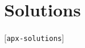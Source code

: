 \documentclass{amsart}
\newcommand{\lbl}[1]{\label{#1}\textup{[\texttt{#1}]}\ \\}
\newcommand{\lbl}{\label}
\renewcommand{\:}       {\colon}
\theoremstyle{definition}
\begin{document}
\section{Solutions}
\lbl{apx-solutions}

\end{document}
